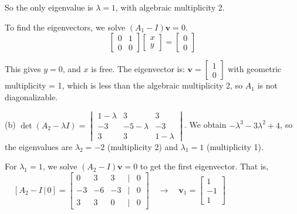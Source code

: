 \documentclass[a4paper,11pt,reqno]{amsart}
\numberwithin{equation}{section}
\begin{document}
\begin{enumerate}
\begin{center}
{{   So the only eigenvalue is \( \lambda = 1 \), with algebraic multiplicity 2.

To find the eigenvectors, we solve \( (A_1 - I) \mathbf{v} = 0 \).
   \[
   \begin{bmatrix} 0 & 1 \\ 0 & 0 \end{bmatrix}
   \begin{bmatrix} x \\ y \end{bmatrix}
   = \begin{bmatrix} 0 \\ 0 \end{bmatrix}
   \]

   This gives \( y = 0 \), and \(x\) is free. The eigenvector is:
   \(
   \mathbf{v} = \begin{bmatrix} 1 \\ 0 \end{bmatrix}
   \) with geometric multiplicity = 1, which is less than the algebraic multiplicity 2, so \(A_1\) is not diagonalizable.

\vspace{0.25cm}

(b) 
   \(
   \det(A_2 - \lambda I) = 
   \begin{vmatrix} 
   1 - \lambda & 3 & 3 \\ 
   -3 & -5 - \lambda & -3 \\ 
   3 & 3 & 1 - \lambda
   \end{vmatrix}
   \). 
   We obtain \( -\lambda^3 -3\lambda^2 + 4 \), so the eigenvalues are \( \lambda_2 = -2 \) (multiplicity 2) and \( \lambda_1 = 1 \) (multiplicity 1).

\vspace{0.25cm}

    For \( \lambda_1 = 1 \), we solve \( (A_2 - I)\mathbf{v} = 0 \) to get the first eigenvector. That is, 
     \[
     [A_2 - I\,|\,0] = \begin{bmatrix} 0 & 3 & 3 & | & 0\\ -3 & -6 & -3 & | & 0 \\ 3 & 3 & 0 & | & 0 \end{bmatrix}
     \quad \to \quad
     \mathbf{v}_1 = \begin{bmatrix} 1 \\ -1 \\ 1 \end{bmatrix} \qquad \qquad \qquad \qquad
     \]

}}
\end{center}
\end{enumerate}
\end{document}
